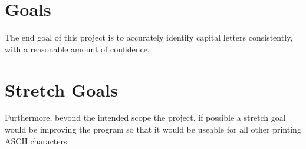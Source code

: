\documentclass{article}
\begin{document}
\section{Goals}
The end goal of this project is to accurately identify capital letters consistently, with a reasonable 
amount of confidence.
\section{Stretch Goals}
Furthermore, beyond the intended scope the project, if possible a stretch goal would be improving
the program so that it would be useable for all other printing ASCII characters.
\end{document}
